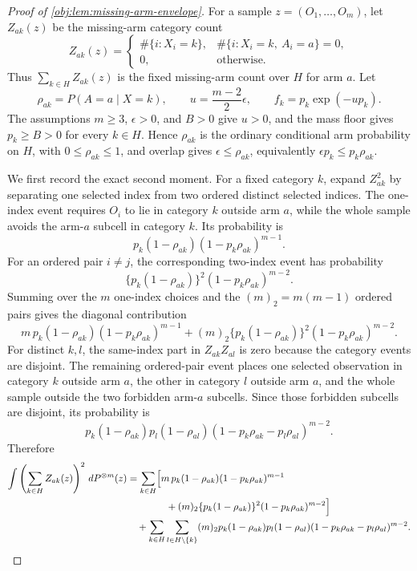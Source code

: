 \documentclass[11pt]{article}
\begin{document}
\begin{proof}[Proof of \cref{obj:lem:missing-arm-envelope}]
For a sample \(z=(O_1,\ldots,O_m)\), let \(Z_{ak}(z)\) be the missing-arm category count
\[
Z_{ak}(z)=
\begin{cases}
\#\{i:X_i=k\}, & \#\{i:X_i=k,\ A_i=a\}=0,\\
0, & \text{otherwise}.
\end{cases}
\]
Thus \(\sum_{k\in H}Z_{ak}(z)\) is the fixed missing-arm count over \(H\) for arm \(a\). Let
\[
\rho_{ak}=P(A=a\mid X=k),
\qquad
u=\frac{m-2}{2}\epsilon,
\qquad
f_k=p_k\exp(-up_k).
\]
The assumptions \(m\ge3\), \(\epsilon>0\), and \(B>0\) give \(u>0\), and the mass floor gives
\(p_k\ge B>0\) for every \(k\in H\). Hence \(\rho_{ak}\) is the ordinary conditional arm probability on
\(H\), with \(0\le \rho_{ak}\le1\), and overlap gives
\(\epsilon\le \rho_{ak}\), equivalently \(\epsilon p_k\le p_k\rho_{ak}\). %

We first record the exact second moment. For a fixed category \(k\), expand \(Z_{ak}^2\) by separating
one selected index from two ordered distinct selected indices. The one-index event requires
\(O_i\) to lie in category \(k\) outside arm \(a\), while the whole sample avoids the arm-\(a\)
subcell in category \(k\). Its probability is
\[
p_k(1-\rho_{ak})(1-p_k\rho_{ak})^{m-1}.
\]
For an ordered pair \(i\ne j\), the corresponding two-index event has probability
\[
\{p_k(1-\rho_{ak})\}^2(1-p_k\rho_{ak})^{m-2}.
\]
Summing over the \(m\) one-index choices and the \((m)_2=m(m-1)\) ordered pairs gives the diagonal
contribution
\[
m\,p_k(1-\rho_{ak})(1-p_k\rho_{ak})^{m-1}
+
(m)_2\{p_k(1-\rho_{ak})\}^2(1-p_k\rho_{ak})^{m-2}.
\]
For distinct \(k,l\), the same-index part in \(Z_{ak}Z_{al}\) is zero because the category events are
disjoint. The remaining ordered-pair event places one selected observation in category \(k\) outside arm
\(a\), the other in category \(l\) outside arm \(a\), and the whole sample outside the two forbidden
arm-\(a\) subcells. Since those forbidden subcells are disjoint, its probability is
\[
p_k(1-\rho_{ak})p_l(1-\rho_{al})
(1-p_k\rho_{ak}-p_l\rho_{al})^{m-2}.
\]
Therefore
\[
\begin{aligned}
\int \left(\sum_{k\in H}Z_{ak}(z)\right)^2\,dP^{\otimes m}(z)
&=
\sum_{k\in H}
\Bigl[
m\,p_k(1-\rho_{ak})(1-p_k\rho_{ak})^{m-1}
\\
&\qquad\qquad
+
(m)_2\{p_k(1-\rho_{ak})\}^2(1-p_k\rho_{ak})^{m-2}
\Bigr]
\\
&\quad+
\sum_{k\in H}\sum_{l\in H\setminus\{k\}}
(m)_2 p_k(1-\rho_{ak})p_l(1-\rho_{al})
(1-p_k\rho_{ak}-p_l\rho_{al})^{m-2}.
\end{aligned}
\]


\end{proof}
\end{document}
